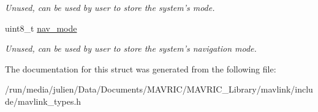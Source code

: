 \begin{DoxyCompactItemize}
\begin{DoxyCompactList}\small\item\em Unused, can be used by user to store the system's mode. \end{DoxyCompactList}\item 
\hypertarget{struct____mavlink__system_ae653c03239304982024c03ac165c5011}{uint8\+\_\+t \hyperlink{struct____mavlink__system_ae653c03239304982024c03ac165c5011}{nav\+\_\+mode}}\label{struct____mavlink__system_ae653c03239304982024c03ac165c5011}

\begin{DoxyCompactList}\small\item\em Unused, can be used by user to store the system's navigation mode. \end{DoxyCompactList}\end{DoxyCompactItemize}


The documentation for this struct was generated from the following file\+:\begin{DoxyCompactItemize}
\item 
/run/media/julien/\+Data/\+Documents/\+M\+A\+V\+R\+I\+C/\+M\+A\+V\+R\+I\+C\+\_\+\+Library/mavlink/include/mavlink\+\_\+types.\+h\end{DoxyCompactItemize}
